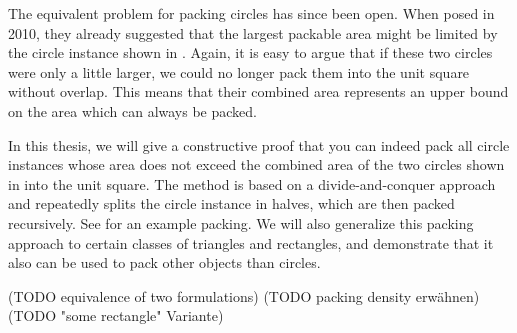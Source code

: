 \documentclass[a4paper,style=print,oneside,bibliography=totoc,nexus,lnum,extramargin]{tubsbook}
\begin{document}


The equivalent problem for packing circles has since been open.
When \textcite{DFL2010circle} posed  in 2010, they already suggested that the largest packable area might be limited by the circle instance shown in . Again, it is easy to argue that if these two circles were only a little larger, we could no longer pack them into the unit square without overlap. This means that their combined area represents an upper bound on the area which can always be packed.


In this thesis, we will give a constructive proof that you can indeed pack all circle instances whose area does not exceed the combined area of the two circles shown in  into the unit square.
The method is based on a divide-and-conquer approach and repeatedly splits the circle instance in halves, which are then packed recursively.
See  for an example packing.
We will also generalize this packing approach to certain classes of triangles and rectangles, and demonstrate that it also can be used to pack other objects than circles.


(TODO equivalence of two formulations)
(TODO packing density erwähnen)
(TODO "some rectangle" Variante)

\end{document}
